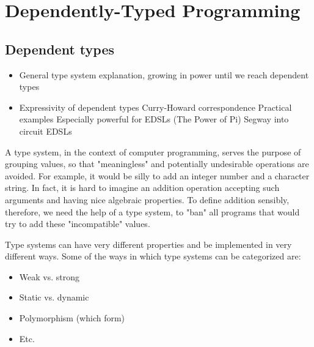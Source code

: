 \documentclass[a4paper,draft]{report}
\begin{document}
        \section{Dependently-Typed Programming}
        \label{sec:dtp}

            \subsection{Dependent types}
            \label{subsec:dependent-types}
                \begin{itemize}
                    \item General type system explanation, growing in power until we reach dependent types
                    \item Expressivity of dependent types
                        \subitem Curry-Howard correspondence
                        \subitem Practical examples
                            \subsubitem Especially powerful for EDSLs (The Power of Pi)
                            \subsubitem Segway into circuit EDSLs
                \end{itemize}

                A type system, in the context of computer programming,
                serves the purpose of grouping values, so that "meaningless" and potentially undesirable operations are avoided.
                For example, it would be silly to add an integer number and a character string.
                In fact, it is hard to imagine an addition operation accepting such arguments and having nice algebraic properties.
                To define addition sensibly, therefore, we need the help of a type system, to "ban" all programs that would
                try to add these "incompatible" values.

                Type systems can have very different properties and be implemented in very different ways.
                Some of the ways in which type systems can be categorized are:
                \begin{itemize}
                    \item Weak vs. strong
                    \item Static vs. dynamic
                    \item Polymorphism (which form)
                    \item Etc.
                \end{itemize}
\end{document}
